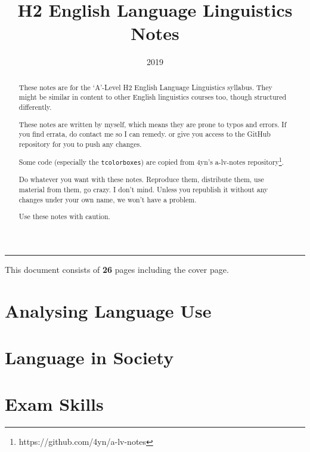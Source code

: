 \documentclass[10pt]{article}
\title{H2 English Language Linguistics Notes}
\author{}
\date{2019}
\begin{document}
\maketitle

\begin{abstract}
	These notes are for the `A'-Level H2 English Language Linguistics syllabus. They might be similar in content to other English linguistics courses too, though structured differently.
	
	These notes are written by myself, which means they are prone to typos and errors. If you find errata, do contact me so I can remedy. or give you access to the GitHub repository for you to push any changes.
	
	Some code (especially the \texttt{tcolorboxes}) are copied from 4yn's a-lv-notes repository\footnote{https://github.com/4yn/a-lv-notes}.
	
	Do whatever you want with these notes. Reproduce them, distribute them, use material from them, go crazy. I don't mind. Unless you republish it without any changes under your own name, we won't have a problem.
	
	Use these notes with caution.
\end{abstract}

\begin{multicols}{2}
\tableofcontents
\end{multicols}

\vspace*{\fill}
\hrule
\begin{center}
	This document consists of \textbf{26} pages including the cover page.
\end{center}

\newpage
\begin{multicols*}{2}

\part{Analysing Language Use}









\part{Language in Society}











\part{Exam Skills}

\end{multicols*}
\end{document}
